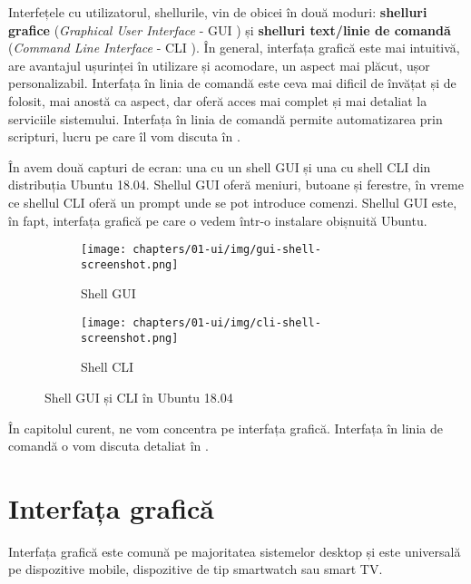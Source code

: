 Interfețele cu utilizatorul, shellurile, vin de obicei în două moduri: \textbf{shelluri grafice} (\textit{Graphical User Interface} - GUI ) și \textbf{shelluri text/linie de comandă} (\textit{Command Line Interface} - CLI ).
În general, interfața grafică este mai intuitivă, are avantajul ușurinței în utilizare și acomodare, un aspect mai plăcut, ușor personalizabil.
Interfața în linia de comandă este ceva mai dificil de învățat și de folosit, mai anostă ca aspect, dar oferă acces mai complet și mai detaliat la serviciile sistemului.
Interfața în linia de comandă permite automatizarea prin scripturi, lucru pe care îl vom discuta în .

În  avem două capturi de ecran: una cu un shell GUI și una cu shell CLI din distribuția Ubuntu 18.04.
Shellul GUI oferă meniuri, butoane și ferestre, în vreme ce shellul CLI oferă un prompt unde se pot introduce comenzi.
Shellul GUI este, în fapt, interfața grafică pe care o vedem într-o instalare obișnuită Ubuntu.

\begin{figure}[htbp]
  \centering
  \begin{subfigure}[b]{0.6\textwidth}
    \texttt{[image: chapters/01-ui/img/gui-shell-screenshot.png]}
    \caption{Shell GUI}
    \label{fig:ui:shell-gui-cli:gui}
  \end{subfigure}

  \begin{subfigure}[b]{0.6\textwidth}
    \texttt{[image: chapters/01-ui/img/cli-shell-screenshot.png]}
    \caption{Shell CLI}
    \label{fig:ui:shell-gui-cli:cli}
  \end{subfigure}

  \caption{Shell GUI și CLI în Ubuntu 18.04}
  \label{fig:ui:shell-gui-cli}
\end{figure}

În capitolul curent, ne vom concentra pe interfața grafică.
Interfața în linia de comandă o vom discuta detaliat în .

\section{Interfața grafică}
\label{sec:ui:gui}

Interfața grafică este comună pe majoritatea sistemelor desktop și este universală pe dispozitive mobile, dispozitive de tip smartwatch sau smart TV.

